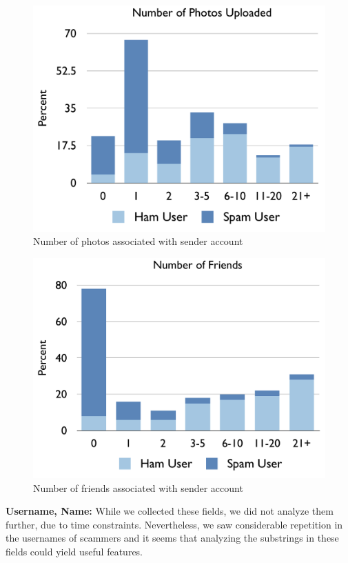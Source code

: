 \documentclass[preprint]{acm_proc_article-sp}
\begin{document}
\begin{figure}[h]
    \centering
    \includegraphics[width=\linewidth]{figures/photos.pdf}
    \caption{Number of photos associated with sender account}
    \label{fig:photos}
\end{figure}

\begin{figure}[h]
    \centering
    \includegraphics[width=\linewidth]{figures/friends.pdf}
    \caption{Number of friends associated with sender account}
    \label{fig:friends}
\end{figure}

\textbf{Username, Name:} While we collected these fields, we did not analyze them further, due to 
time constraints. Nevertheless, we saw considerable repetition in the usernames of scammers 
and it seems that analyzing the substrings in these fields could yield useful features.
\end{document}
